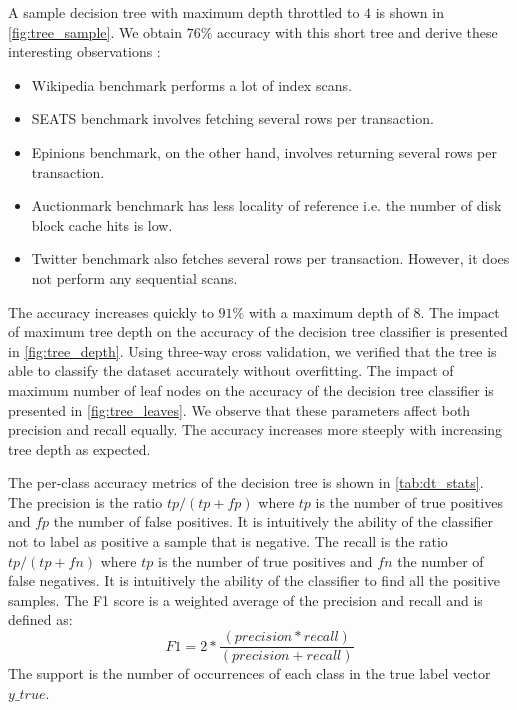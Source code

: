 A sample decision tree with maximum depth throttled to $4$ is shown in
\cref{fig:tree_sample}. We obtain $76\%$ accuracy with this short tree
and derive these interesting observations :

\begin{itemize}
  \item Wikipedia benchmark performs a lot of index scans.
  \item SEATS benchmark involves fetching several rows per transaction.
  \item Epinions benchmark, on the other hand, involves returning several rows
  per transaction.
  \item Auctionmark benchmark has less locality of reference i.e. the number of
  disk block cache hits is low.
  \item Twitter benchmark also fetches several rows per transaction. However, it
  does not perform any sequential scans.
\end{itemize}


The accuracy increases quickly to $91\%$ with a maximum depth of $8$. The impact
of maximum tree depth on the accuracy of the decision tree classifier
is presented in \cref{fig:tree_depth}. Using three-way cross validation,
we verified that the tree is able to classify the dataset accurately 
without overfitting. 
The impact of maximum number of leaf nodes on the accuracy of the 
decision tree classifier is presented in \cref{fig:tree_leaves}.
We observe that these parameters affect both precision and recall
equally. The accuracy increases more steeply with increasing tree
depth as expected.

The per-class accuracy metrics of the decision tree is shown in 
\cref{tab:dt_stats}.
The precision is the ratio $tp/(tp+fp)$ where $tp$ is the number of true
positives and $fp$ the number of false positives. 
It is intuitively the ability of the classifier not to label 
as positive a sample that is negative.
The recall is the ratio $tp/(tp+fn)$ where $tp$ is the number of true
positives and $fn$ the number of false negatives. It is intuitively the
ability of the classifier to find all the positive samples.
The F1 score is a weighted average of the precision and recall 
and is defined as:
$$F1 = 2 * \frac{(precision * recall)}{(precision + recall)}$$
The support is the number of occurrences of each class in the true label
vector $y\_true$.

